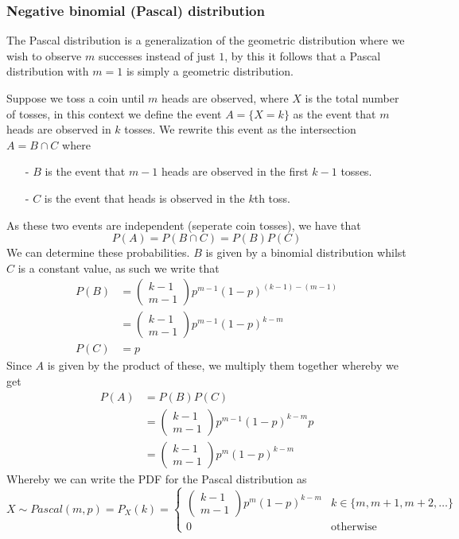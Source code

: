 \subsubsection{Negative binomial (Pascal) distribution}
The Pascal distribution is a generalization of the geometric distribution where we wish to observe $m$ successes instead of just $1$, by this it follows that a Pascal distribution with $m=1$ is simply a geometric distribution.

Suppose we toss a coin until $m$ heads are observed, where $X$ is the total number of tosses, in this context we define the event $A=\{X=k\}$ as the event that $m$ heads are observed in $k$ tosses. We rewrite this event as the intersection $A=B\cap C$ where
\begin{itemize}
    \item[-] $B$ is the event that $m-1$ heads are observed in the first $k-1$ tosses.
    \item[-] $C$ is the event that heads is observed in the $k$th toss.
\end{itemize}
As these two events are independent (seperate coin tosses), we have that
\[
    P(A)=P(B\cap C)=P(B)P(C)
\]
We can determine these probabilities. $B$ is given by a binomial distribution whilst $C$ is a constant value, as such we write that
\begin{align*}
    P(B)&=\begin{pmatrix}k-1\\m-1\end{pmatrix}p^{m-1}(1-p)^{(k-1)-(m-1)} \\
        &=\begin{pmatrix}k-1\\m-1\end{pmatrix}p^{m-1}(1-p)^{k-m} \\
    P(C)&=p
\end{align*}
Since $A$ is given by the product of these, we multiply them together whereby we get
\begin{align*}
    P(A)&=P(B)P(C) \\
        &=\begin{pmatrix}k-1\\m-1\end{pmatrix}p^{m-1}(1-p)^{k-m}p \\
        &=\begin{pmatrix}k-1\\m-1\end{pmatrix}p^{m}(1-p)^{k-m}
\end{align*}
Whereby we can write the PDF for the Pascal distribution as
\[
    X\sim Pascal(m,p)=P_{X}(k)=\begin{cases}\begin{pmatrix}k-1\\m-1\end{pmatrix}p^{m}(1-p)^{k-m} & k\in\{m,m+1,m+2,\ldots\} \\ 0 & \text{otherwise}\end{cases}
\]
